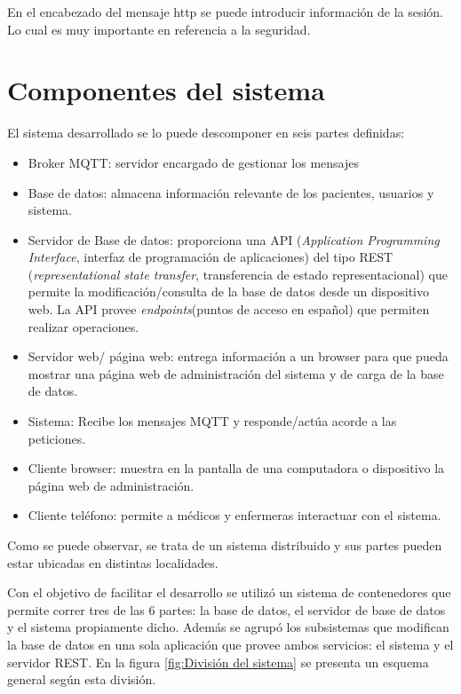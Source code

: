 En el encabezado del mensaje http se puede introducir información de la sesión. Lo cual es muy importante en referencia a la seguridad. 

\section{Componentes del sistema}
\label{sec:Sistema General}

El sistema desarrollado se lo puede descomponer en seis partes definidas:

\begin{itemize}
\item  Broker MQTT: servidor encargado de gestionar los mensajes
\item  Base de datos: almacena información relevante de los pacientes, usuarios y sistema.
\item  Servidor de Base de datos: proporciona una API (\textit{Application Programming Interface}, interfaz de programación de aplicaciones) del tipo REST (\textit{representational state transfer}, transferencia de estado representacional) que permite la modificación/consulta de la base de datos desde un dispositivo web. La API provee \textit{endpoints}(puntos de acceso en español) que permiten realizar operaciones.
\item  Servidor web/ página web: entrega información a un browser para que pueda mostrar una página web de administración del sistema y de carga de la base de datos.
\item  Sistema: Recibe los mensajes MQTT y responde/actúa acorde a las peticiones.
\item Cliente browser: muestra en la pantalla de una computadora o dispositivo la página web de administración.
\item Cliente teléfono: permite a médicos y enfermeras interactuar con el sistema.
\end{itemize}

Como se puede observar, se trata de un sistema distribuido y sus partes pueden estar ubicadas en distintas localidades.

Con el objetivo de facilitar el desarrollo se utilizó un sistema de contenedores que permite correr tres de las 6 partes: la base de datos, el servidor de base de datos y el sistema propiamente dicho. Además se agrupó los subsistemas que modifican la base de datos en una sola aplicación que provee ambos servicios: el sistema y el servidor REST. En la figura  \ref{fig:División del sistema} se presenta un esquema general según esta división.


